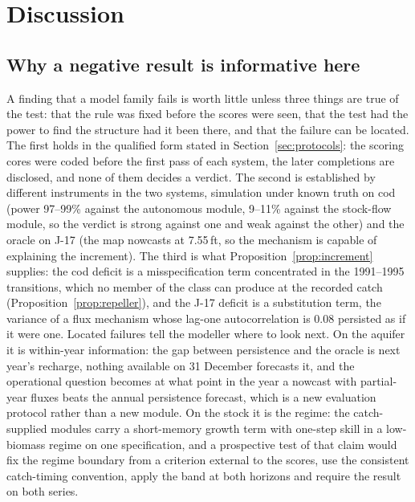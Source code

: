 \FloatBarrier
\section{Discussion}\label{sec:discussion}

\subsection{Why a negative result is informative here}\label{sec:whyinformative}

A finding that a model family fails is worth little unless three things are true of the test: that the rule was fixed before the scores were seen, that the test had the power to find the structure had it been there, and that the failure can be located. The first holds in the qualified form stated in Section~\ref{sec:protocols}: the scoring cores were coded before the first pass of each system, the later completions are disclosed, and none of them decides a verdict. The second is established by different instruments in the two systems, simulation under known truth on cod (power 97--99\% against the autonomous module, 9--11\% against the stock-flow module, so the verdict is strong against one and weak against the other) and the oracle on J-17 (the map nowcasts at 7.55\,ft, so the mechanism is capable of explaining the increment). The third is what Proposition~\ref{prop:increment} supplies: the cod deficit is a misspecification term concentrated in the 1991--1995 transitions, which no member of the class can produce at the recorded catch (Proposition~\ref{prop:repeller}), and the J-17 deficit is a substitution term, the variance of a flux mechanism whose lag-one autocorrelation is 0.08 persisted as if it were one. Located failures tell the modeller where to look next. On the aquifer it is within-year information: the gap between persistence and the oracle is next year's recharge, nothing available on 31 December forecasts it, and the operational question becomes at what point in the year a nowcast with partial-year fluxes beats the annual persistence forecast, which is a new evaluation protocol rather than a new module. On the stock it is the regime: the catch-supplied modules carry a short-memory growth term with one-step skill in a low-biomass regime on one specification, and a prospective test of that claim would fix the regime boundary from a criterion external to the scores, use the consistent catch-timing convention, apply the band at both horizons and require the result on both series.

